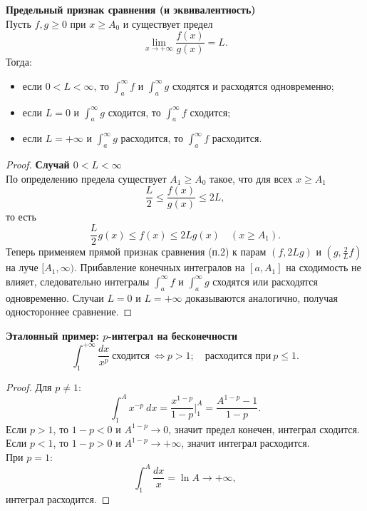 \documentclass[14pt]{extreport}
\begin{document}
    \begin{theorem}
        \textbf{Предельный признак сравнения (и эквивалентность)}\\
        Пусть $f,g \geq 0$ при $x \geq A_0$ и существует предел
        \[
        \lim_{x \rightarrow +\infty} \frac{f(x)}{g(x)} = L.
        \]
        Тогда:
        \begin{itemize}
            \item если $0 < L < \infty$, то $\int_a^\infty f$ и $\int_a^\infty g$ сходятся и расходятся одновременно;
            \item если $L = 0$ и $\int_a^\infty g$ сходится, то $\int_a^\infty f$ сходится;
            \item если $L = +\infty$ и $\int_a^\infty g$ расходится, то $\int_a^\infty f$ расходится.
        \end{itemize}
    \end{theorem}
    \begin{proof}
        \textbf{Случай $0 < L < \infty$}\\
        По определению предела существует $A_1 \geq A_0$ такое, что для всех $x \geq A_1$
        \[
        \frac{L}{2} \leq \frac{f(x)}{g(x)} \leq 2L,
        \]
        то есть
        \[
        \frac{L}{2} g(x) \leq f(x) \leq 2L g(x) \quad (x \geq A_1).
        \]
        Теперь применяем прямой признак сравнения (п.2) к парам $(f, 2Lg)$ и $(g, \frac{2}{L}f)$ на луче $[A_1,\infty)$. Прибавление конечных интегралов на $[a,A_1]$ на сходимость не влияет, следовательно интегралы $\int_a^\infty f$ и $\int_a^\infty g$ сходятся или расходятся одновременно. Случаи $L = 0$ и $L = +\infty$ доказываются аналогично, получая одностороннее сравнение.
    \end{proof}

    \begin{theorem}
        \textbf{Эталонный пример: $p$-интеграл на бесконечности}\\
        \[
        \int_1^{+\infty} \frac{dx}{x^p}\ \text{сходится}\ \Leftrightarrow p>1; \quad \text{расходится при}\ p \leq 1.
        \]
    \end{theorem}
    \begin{proof}
        Для $p \neq 1$:
        \[
        \int_1^A x^{-p}\ dx = \frac{x^{1-p}}{1-p} \Bigg|_1^A = \frac{A^{1-p} - 1}{1 - p}.
        \]
        Если $p > 1$, то $1 - p < 0$ и $A^{1-p} \rightarrow 0$, значит предел конечен, интеграл сходится. Если $p < 1$, то $1 - p > 0$ и $A^{1-p} \rightarrow +\infty$, значит интеграл расходится.\\
        При $p = 1$:
        \[
        \int_1^A \frac{dx}{x} = \ln A \rightarrow +\infty,
        \]
        интеграл расходится.
    \end{proof}
\end{document}
